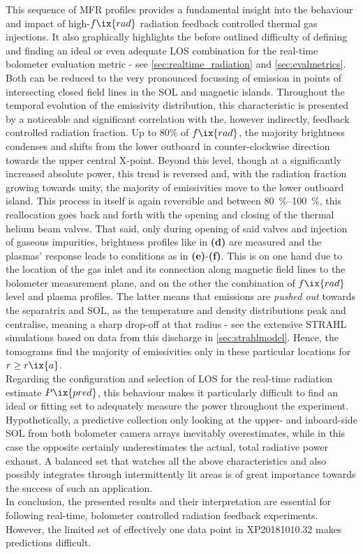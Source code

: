             This sequence of MFR profiles provides a fundamental insight into the behaviour and impact of high-$f\ix{rad}$ radiation feedback controlled thermal gas injections. It also graphically highlights the before outlined difficulty of defining and finding an ideal or even adequate LOS combination for the real-time bolometer evaluation metric - see \cref{sec:realtime_radiation} and \cref{sec:evalmetrics}. Both can be reduced to the very pronounced focussing of emission in points of intersecting closed field lines in the SOL and magnetic islands. Throughout the temporal evolution of the emissivity distribution, this characteristic is presented by a noticeable and significant correlation with the, however indirectly, feedback controlled radiation fraction. Up to 80\% of $f\ix{rad}$, the majority brightness condenses and shifts from the lower outboard in counter-clockwise direction towards the upper central X-point. Beyond this level, though at a significantly increased absolute power, this trend is reversed and, with the radiation fraction growing towards unity, the majority of emissivities move to the lower outboard island. This process in itself is again reversible and between \SIrange{80}{100}{\percent}, this reallocation goes back and forth with the opening and closing of the thermal helium beam valves. That said, only during opening of said valves and injection of gaseous impurities, brightness profiles like in \textbf{(d)} are measured and the plasmas' response leads to conditions as in \textbf{(e)}-\textbf{(f)}. This is on one hand due to the location of the gas inlet and its connection along magnetic field lines to the bolometer measurement plane, and on the other the combination of $f\ix{rad}$ level and plasma profiles. The latter means that emissions are \textit{pushed out} towards the separatrix and SOL, as the temperature and density distributions peak and centralise, meaning a sharp drop-off at that radius - see the extensive STRAHL simulations based on data from this discharge in \cref{sec:strahlmodel}. Hence, the tomograms find the majority of emissivities only in these particular locations for $r\ge r\ix{a}$.\\%
            Regarding the configuration and selection of LOS for the real-time radiation estimate $P\ix{pred}$, this behaviour makes it particularly difficult to find an ideal or fitting set to adequately measure the power throughout the experiment. Hypothetically, a predictive collection only looking at the upper- and inboard-side SOL from both bolometer camera arrays inevitably overestimates, while in this case the opposite certainly underestimates the actual, total radiative power exhaust. A balanced set that watches all the above characteristics and also possibly integrates through intermittently lit areas is of great importance towards the success of such an application.\\%
            In conclusion, the presented results and their interpretation are essential for following real-time, bolometer controlled radiation feedback experiments. However, the limited set of effectively one data point in XP20181010.32 makes predictions difficult.%
%

